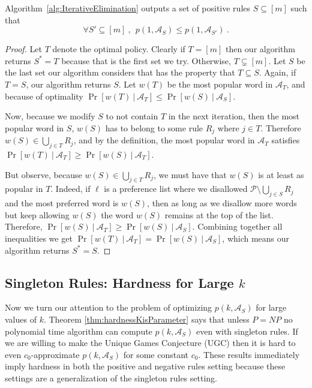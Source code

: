 \documentclass[prodmode,acmec]{ec-acmsmall}
\newcommand{\PasswordSpace}{\mathcal{P}}
\begin{document}
\begin{theorem} \label{thm:AlgorithmAddingSubsets}
Algorithm~\ref{alg:IterativeElimination} outputs a set of positive rules $S \subseteq [m]$ such that 
\[ \forall S'\subseteq [m] ~, ~ ~ p\left(1,\mathcal{A}_S \right) \leq p\left(1,\mathcal{A}_{S'} \right) \  . \]
\end{theorem}
\begin{proof}
Let $T$ denote the optimal policy. Clearly if $T = [m]$ then our algorithm returns $S^* = T$ because that is the first set we try. Otherwise, $T\subsetneq [m]$. Let $S$ be the last set our algorithm considers that has the property that $T\subseteq S$. Again, if $T=S$, our algorithm returns $S$. Let $w(T)$ be the most popular word in $\mathcal{A}_T$, and because of optimality $\Pr[w(T) ~|~ \mathcal{A}_T] \leq \Pr[w(S) ~|~ \mathcal{A}_S]$.

Now, because we modify $S$ to not contain $T$ in the next iteration, then the most popular word in $S$, $w(S)$ has to belong to some rule $R_j$ where $j \in T$. Therefore $w(S) \in \bigcup_{j\in T} R_j$, and by the definition, the most popular word in $\mathcal{A}_T$ satisfies $\Pr[w(T) ~|~ \mathcal{A}_T] \geq \Pr[w(S) ~|~ \mathcal{A}_T]$. 

But observe, because $w(S) \in \bigcup_{j\in T} R_j$, we must have that $w(S)$ is at least as popular in $T$. 
Indeed, if $\ell$ is a preference list where we disallowed $\PasswordSpace \setminus \bigcup_{j\in S} R_j$ and the most preferred word is $w(S)$, then as long as we disallow more words but keep allowing $w(S)$ the word $w(S)$ remains at the top of the list. Therefore, $\Pr[w(S)~|~ \mathcal{A}_T] \geq \Pr[w(S)~|~ \mathcal{A}_S]$. Combining together all inequalities we get $\Pr[w(T) ~|~ \mathcal{A}_T]  = \Pr[w(S) ~|~ \mathcal{A}_S]$, which means our algorithm returns $S^* = S$.
\end{proof}




\subsection{Singleton Rules: Hardness for Large $k$} \label{subsec:HardessKisParameter}
Now we turn our attention to the problem of optimizing $p\left(k,\mathcal{A}_S \right)$ for large values of $k$. Theorem \ref{thm:hardnessKisParameter} says that unless $P=NP$ no polynomial time algorithm can compute $p\left(k,\mathcal{A}_S \right)$ even with singleton rules. If we are willing to make the Unique Games Conjecture (UGC) \cite{khot2002power} then it is hard to even $c_0$-approximate $p\left(k,\mathcal{A}_S\right)$ for some constant $c_0$. These results immediately imply hardness in both the positive and negative rules setting because these settings are a generalization of the singleton rules setting. 
\end{document}
